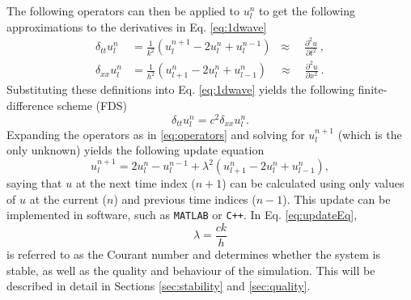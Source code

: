 The following operators can then be applied to $u_l^n$ to get the following approximations to the derivatives in Eq. \eqref{eq:1dwave}
\begin{subequations}\label{eq:operators}
    \begin{align}
         \delta_{tt}u_l^n &= \frac{1}{k^2}\left(u_l^{n+1}-2u_l^n + u_l^{n-1}\right)\;\;\approx\quad\frac{\partial^2u}{\partial t^2}\label{eq:secondOrderTime}\ ,\\
         \delta_{xx}u_l^n &= \frac{1}{h^2}\left(u_{l+1}^n-2u_l^n + u_{l-1}^n\right)\quad\approx\quad \frac{\partial^2u}{\partial x^2}\ .\label{eq:secondOrderSpace}
    \end{align}
\end{subequations}
Substituting these definitions into Eq. \eqref{eq:1dwave} yields the following finite-difference scheme (FDS)
\begin{equation}\label{eq:FDS}
    \delta_{tt}u_l^n = c^2 \delta_{xx}u_l^n.
\end{equation}
Expanding the operators as in %
\eqref{eq:operators} and solving for $u_l^{n+1}$ (which is the only unknown) yields the following update equation
\begin{equation}\label{eq:updateEq}
    u_l^{n+1} = 2u_l^n-u_l^{n-1} + \lambda^2 \left(u_{l+1}^n-2u_l^n + u_{l-1}^n\right),
\end{equation}
saying that $u$ at the next time index ($n+1$) can be calculated using only values of $u$ at the current ($n$) and previous time indices ($n-1$). This update can be implemented in software, such as {\tt MATLAB} or {\tt C++}. In Eq. \eqref{eq:updateEq},
\begin{equation}\label{eq:lambdaDef}
    \lambda = \frac{ck}{h}
\end{equation}
is referred to as the Courant number and determines whether the system is stable, as well as the quality and behaviour of the simulation. This will be described in detail in Sections \ref{sec:stability} and \ref{sec:quality}.

